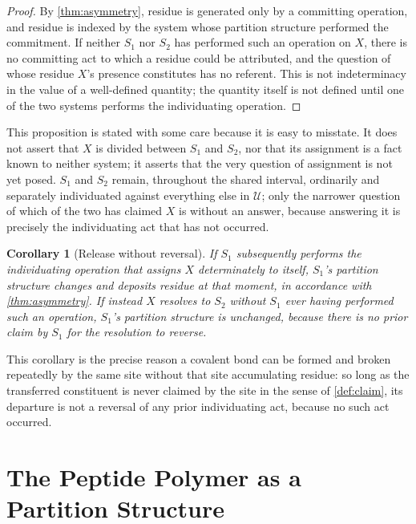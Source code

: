 \documentclass[11pt,twocolumn,a4paper]{article}
\theoremstyle{plain}
\newtheorem{corollary}[theorem]{Corollary}
\theoremstyle{definition}
\theoremstyle{remark}
\newcommand{\Univ}{\mathcal{U}}
\begin{document}
\begin{proof}
By \cref{thm:asymmetry}, residue is generated only by a committing
operation, and residue is indexed by the system whose partition structure
performed the commitment. If neither $S_1$ nor $S_2$ has performed such an
operation on $X$, there is no committing act to which a residue could be
attributed, and the question of whose residue $X$'s presence constitutes has
no referent. This is not indeterminacy in the value of a well-defined
quantity; the quantity itself is not defined until one of the two systems
performs the individuating operation.
\end{proof}

This proposition is stated with some care because it is easy to misstate.
It does not assert that $X$ is divided between $S_1$ and $S_2$, nor that its
assignment is a fact known to neither system; it asserts that the very
question of assignment is not yet posed. $S_1$ and $S_2$ remain, throughout
the shared interval, ordinarily and separately individuated against
everything else in $\Univ$; only the narrower question of which of the two
has claimed $X$ is without an answer, because answering it is precisely the
individuating act that has not occurred.

\begin{corollary}[Release without reversal]
\label{cor:release-noclaim}
If $S_1$ subsequently performs the individuating operation that assigns $X$
determinately to itself, $S_1$'s partition structure changes and deposits
residue at that moment, in accordance with \cref{thm:asymmetry}. If instead
$X$ resolves to $S_2$ without $S_1$ ever having performed such an operation,
$S_1$'s partition structure is unchanged, because there is no prior claim
by $S_1$ for the resolution to reverse.
\end{corollary}

This corollary is the precise reason a covalent bond can be formed and
broken repeatedly by the same site without that site accumulating residue:
so long as the transferred constituent is never claimed by the site in the
sense of \cref{def:claim}, its departure is not a reversal of any prior
individuating act, because no such act occurred.

\part{The Peptide Polymer as a Partition Structure}
\label{part:polymer}
\end{document}
